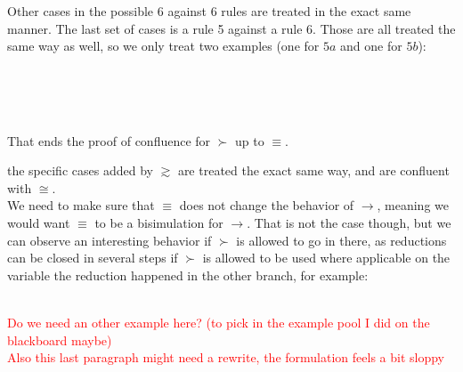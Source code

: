 \begin{myproof}
Other cases in the possible 6 against 6 rules are treated in the exact same manner. The last set of cases is a rule 5 against a rule 6. Those are all treated the same way as well, so we only treat two examples (one for $5a$ and one for $5b$):\\
\\
\\~\\
That ends the proof of confluence for $\succ$ up to $\equiv$.
\end{myproof}

\remark the specific cases added by $\gtrsim$ are treated the exact same way, and are confluent with $\cong$.\\

We need to make sure that $\equiv$ does not change the behavior of $\to$, meaning we would want $\equiv$ to be a bisimulation for $\to$. That is not the case though, but we can observe an interesting behavior if $\succ$ is allowed to go in there, as reductions can be closed in several steps if $\succ$ is allowed to be used where applicable on the variable the reduction happened in the other branch, for example:

\\

\textcolor{red}{Do we need an other example here? (to pick in the example pool I did on the blackboard maybe)\\
Also this last paragraph might need a rewrite, the formulation feels a bit sloppy} %